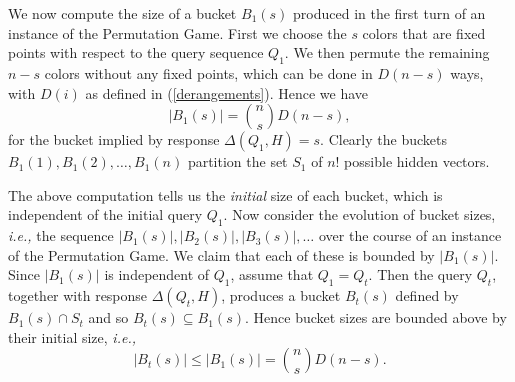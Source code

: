 \documentclass[12pt, a4paper]{article}
\newcommand{\intersect}{\cap}         %
\begin{document}
	We now compute the size of a bucket $B_1(s)$ produced in the first turn of an instance of the Permutation Game. First we choose the $s$ colors that are fixed points with respect to the query sequence $Q_1$. We then permute the remaining $n-s$ colors without any fixed points, which can be done in $D(n - s)$ ways, with $D(i)$ as defined in (\ref{derangements}). Hence we have
	\begin{equation*}
		|B_1(s)| = \binom{n}{s}D(n-s),
	\end{equation*}
	for the bucket implied by response $\Delta(Q_1, H) = s$. Clearly the buckets $B_1(1), B_1(2), \ldots, B_1(n)$ partition the set $S_1$ of $n!$ possible hidden vectors.
	
	The above computation tells us the \textit{initial} size of each bucket, which is independent of the initial query $Q_1$. Now consider the evolution of bucket sizes, \textit{i.e.,} the sequence $|B_1(s)|, |B_2(s)|, |B_3(s)|, \ldots$ over the course of an instance of the Permutation Game. We claim that each of these is bounded by $|B_1(s)|$. Since $|B_1(s)|$ is independent of $Q_1$, assume that $Q_1 = Q_t$. Then the query $Q_t$, together with response $\Delta(Q_t, H)$, produces a bucket $B_t(s)$ defined by $B_1(s)\intersect S_t$ and so $B_t(s) \subseteq B_1(s)$. Hence bucket sizes are bounded above by their initial size, \textit{i.e.,}
	\begin{equation*}
		|B_t(s)|\le |B_1(s)| = \binom{n}{s}D(n-s).
	\end{equation*}
\end{document}
